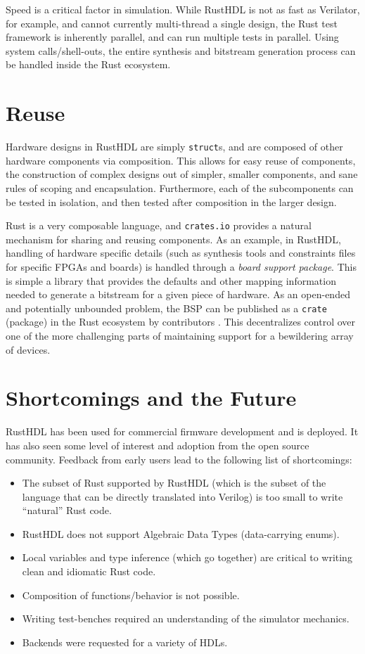 \documentclass[sigplan,screen,sigconf]{acmart}
\begin{document}
Speed is a critical factor in simulation.  While RustHDL is not as fast as Verilator, for example,
and cannot currently multi-thread a single design, the Rust test framework is inherently parallel,
and can run multiple tests in parallel.  Using system calls/shell-outs, the entire 
synthesis and bitstream generation process can be handled inside the Rust ecosystem.

\section{Reuse}
Hardware designs in RustHDL are simply \verb|struct|s, and are composed of other 
hardware components via composition.  This allows for easy reuse of components, the
construction of complex designs out of simpler, smaller components, and sane rules of
scoping and encapsulation.  Furthermore, each of the subcomponents can be tested in 
isolation, and then tested after composition in the larger design. 

Rust is a very composable language, and \verb|crates.io| provides a natural mechanism
for sharing and reusing components.  As an example, in RustHDL, handling of hardware specific
details (such as synthesis tools and constraints files for specific FPGAs and boards) is 
handled through a \emph{board support package}.  This is simple a library that provides the
defaults and other mapping information needed to generate a bitstream for a given piece of
hardware.  As an open-ended and potentially unbounded problem, the BSP can be published as
a \verb|crate| (package) in the Rust ecosystem by contributors \cite{b7}.  This decentralizes control
over one of the more challenging parts of maintaining support for a bewildering array of 
devices. 

\section{Shortcomings and the Future}
RustHDL has been used for commercial firmware development and is deployed.  It has also seen 
some level of interest and adoption from the open source community.  Feedback from early users 
lead to the following list of shortcomings:

\begin{itemize}
  \item The subset of Rust supported by RustHDL (which is the subset of the language that can be 
  directly translated into Verilog) is too small to write ``natural'' Rust code. 
  \item RustHDL does not support Algebraic Data Types (data-carrying enums).
  \item Local variables and type inference (which go together) are critical to writing clean and
  idiomatic Rust code.  
  \item Composition of functions/behavior is not possible. 
  \item Writing test-benches required an understanding of the simulator mechanics.
  \item Backends were requested for a variety of HDLs.
\end{itemize}
\end{document}
